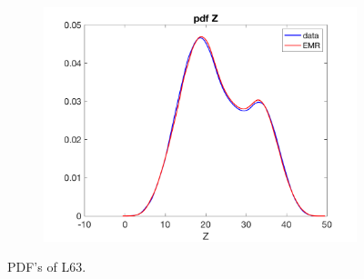 \documentclass[12pt]{article}
\begin{document}
\begin{figure}[H]
\begin{subfigure}[b]{0.3\textwidth}
		\includegraphics[width=\textwidth]{plots/l63/pdfzl63.png}
	\end{subfigure}
	\caption{PDF's of L63.}
\end{figure}
\end{document}
